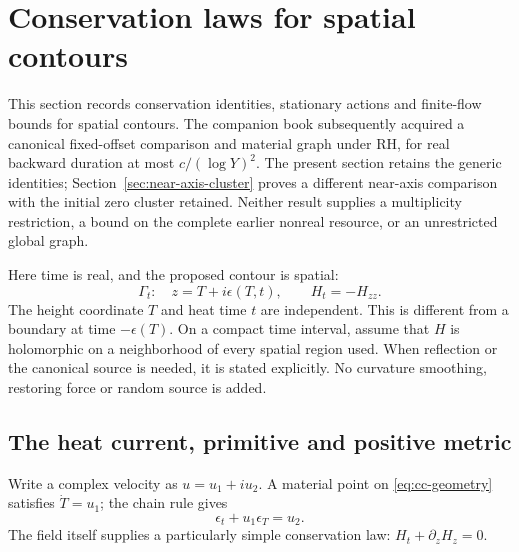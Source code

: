 
\section{Conservation laws for spatial contours}
\label{sec:conserved-contours}

This section records conservation identities, stationary actions and
finite-flow bounds for spatial contours. The companion book
\cite[Theorems 1.1 and 3.1]{book-contours} subsequently acquired a
canonical fixed-offset comparison and material graph under RH, for real
backward duration at most $c/(\log Y)^2$. The present section retains the
generic identities; Section~\ref{sec:near-axis-cluster} proves a different
near-axis comparison with the initial zero cluster retained.
Neither result supplies a multiplicity restriction, a bound on the
complete earlier nonreal resource, or an unrestricted global graph.

Here time is real, and the proposed contour is spatial:
\begin{equation}
 \Gamma_t:\quad z=T+i\epsilon(T,t),\qquad H_t=-H_{zz}.
 \label{eq:cc-geometry}
\end{equation}
The height coordinate $T$ and heat time $t$ are independent.  This is
different from a boundary at time $-\epsilon(T)$.  On a compact time
interval, assume that $H$ is holomorphic on a neighborhood of every
spatial region used.  When reflection or the canonical source is needed,
it is stated explicitly.  No curvature smoothing, restoring force or
random source is added.

\subsection{The heat current, primitive and positive metric}

Write a complex velocity as $u=u_1+iu_2$.  A material point on
\eqref{eq:cc-geometry} satisfies $\dot T=u_1$; the chain rule gives
\begin{equation}
 \epsilon_t+u_1\epsilon_T=u_2.
 \label{eq:cc-graph}
\end{equation}
The field itself supplies a particularly simple conservation law:
$H_t+\partial_zH_z=0$.

